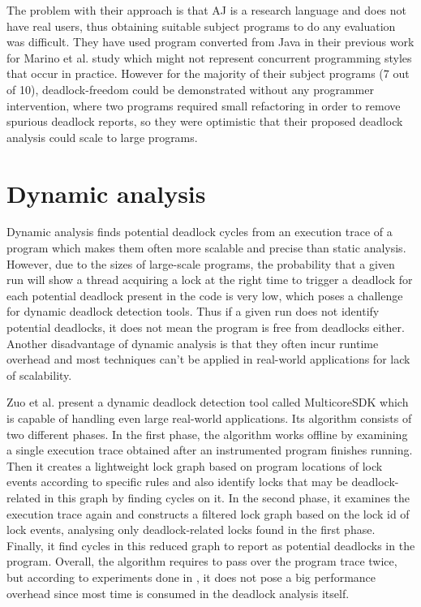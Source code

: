 The problem with their approach is that AJ is a research language and does not have real users, thus obtaining suitable subject programs to do any evaluation was difficult.
They have used program converted from Java in their previous work \cite{dolby} for Marino et al. study \cite{marino} which might not represent concurrent programming styles that occur in practice.
However for the majority of their subject programs (7 out of 10), deadlock-freedom could be demonstrated without any programmer intervention, where two programs required
small refactoring in order to remove spurious deadlock reports, so they were optimistic that their proposed deadlock analysis could scale to large programs.

\section{Dynamic analysis}

Dynamic analysis finds potential deadlock cycles from an execution trace of a program which makes them often more scalable and precise than static analysis.
However, due to the sizes of large-scale programs, the probability that a given run will show a thread acquiring a lock at the right time to trigger a deadlock for
each potential deadlock present in the code is very low, which poses a challenge for dynamic deadlock detection tools. Thus if a given run does not identify potential
deadlocks, it does not mean the program is free from deadlocks either. Another disadvantage of dynamic analysis is that they often incur runtime overhead and most techniques
can't be applied in real-world applications for lack of scalability.

Zuo et al. \cite{mcsdk} present a dynamic deadlock detection tool called MulticoreSDK which is capable of handling even large real-world applications. Its algorithm consists of two different phases.
In the first phase, the algorithm works offline by examining a single execution trace obtained after an instrumented program finishes running.
Then it creates a lightweight lock graph based on program locations of lock events according to specific rules
and also identify locks that may be deadlock-related in this graph by finding cycles on it.
In the second phase, it examines the execution trace again and constructs a filtered lock graph based on the lock id of lock events, analysing only deadlock-related locks
found in the first phase. Finally, it find cycles in this reduced graph to report as potential deadlocks in the program.
Overall, the algorithm requires to pass over the program trace twice, but according to experiments done in \cite{mcsdk}, it does not pose a big performance overhead since
most time is consumed in the deadlock analysis itself.

